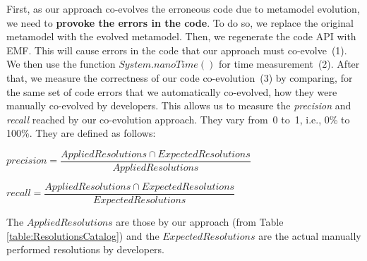 First, as our approach co-evolves the erroneous code due to metamodel evolution, we need to \textbf{provoke the errors in the code}. To do so, we replace the original metamodel with the evolved metamodel. Then, we regenerate the code API with EMF. This will cause errors in the code that our approach must co-evolve~(1).  
We then use the function $System.nanoTime()$ for time measurement~(2). 
After that, we measure the correctness of our code co-evolution~(3) by comparing, for the same set of code errors that we automatically co-evolved, how they were manually co-evolved by developers. This allows us to measure the \emph{precision} and \emph{recall} reached by our co-evolution approach. They vary from~0 to~1, i.e., 0\% to 100\%. They are defined as follows:
%
%




	
	\vspace{1em}
	\noindent $ precision = \dfrac{Applied Resolutions \cap Expected Resolutions}{Applied Resolutions} $
	
	\vspace{1em}
	
	\noindent $ recall = \dfrac{Applied Resolutions \cap Expected Resolutions}{Expected Resolutions} $
	\vspace{1em}
	
	The $Applied Resolutions$ are those by our approach (from Table \ref{table:ResolutionsCatalog}) and  the $Expected Resolutions$ are the actual manually performed resolutions by developers.  %
	
